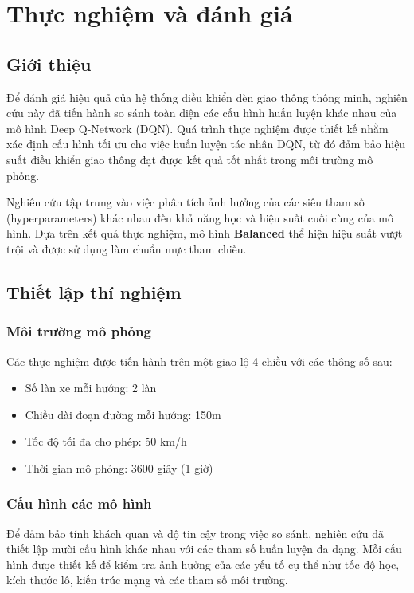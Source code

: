 \chapter{Thực nghiệm và đánh giá}

\section{Giới thiệu}

Để đánh giá hiệu quả của hệ thống điều khiển đèn giao thông thông minh, nghiên cứu này đã tiến hành so sánh toàn diện các cấu hình huấn luyện khác nhau của mô hình Deep Q-Network (DQN). Quá trình thực nghiệm được thiết kế nhằm xác định cấu hình tối ưu cho việc huấn luyện tác nhân DQN, từ đó đảm bảo hiệu suất điều khiển giao thông đạt được kết quả tốt nhất trong môi trường mô phỏng.

Nghiên cứu tập trung vào việc phân tích ảnh hưởng của các siêu tham số (hyperparameters) khác nhau đến khả năng học và hiệu suất cuối cùng của mô hình. Dựa trên kết quả thực nghiệm, mô hình \textbf{Balanced} thể hiện hiệu suất vượt trội và được sử dụng làm chuẩn mực tham chiếu.

\section{Thiết lập thí nghiệm}

\subsection{Môi trường mô phỏng}
Các thực nghiệm được tiến hành trên một giao lộ 4 chiều với các thông số sau:
\begin{itemize}
    \item Số làn xe mỗi hướng: 2 làn
    \item Chiều dài đoạn đường mỗi hướng: 150m
    \item Tốc độ tối đa cho phép: 50 km/h
    \item Thời gian mô phỏng: 3600 giây (1 giờ)
\end{itemize}

\subsection{Cấu hình các mô hình}

Để đảm bảo tính khách quan và độ tin cậy trong việc so sánh, nghiên cứu đã thiết lập mười cấu hình khác nhau với các tham số huấn luyện đa dạng. Mỗi cấu hình được thiết kế để kiểm tra ảnh hưởng của các yếu tố cụ thể như tốc độ học, kích thước lô, kiến trúc mạng và các tham số môi trường.

